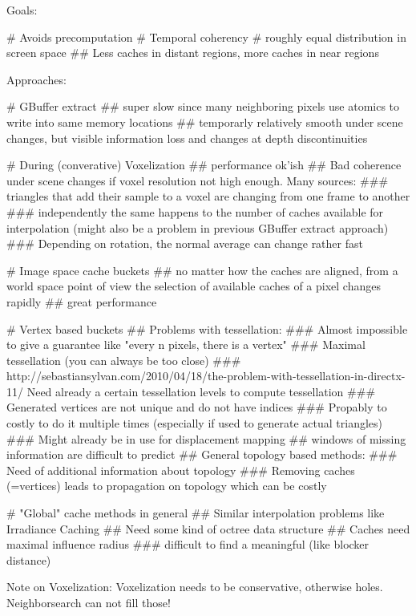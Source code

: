 \documentclass[thesis.tex]{subfiles}
\begin{document}
Goals:
\begin{easylist}[itemize]
# Avoids precomputation
# Temporal coherency
# roughly equal distribution in screen space
## Less caches in distant regions, more caches in near regions
\end{easylist}
Approaches:
\begin{easylist}[itemize]
# GBuffer extract
## super slow since many neighboring pixels use atomics to write into same memory locations
## temporarly relatively smooth under scene changes, but visible information loss and changes at depth discontinuities

# During (converative) Voxelization
## performance ok'ish
## Bad coherence under scene changes if voxel resolution not high enough. Many sources:
### triangles that add their sample to a voxel are changing from one frame to another
### independently the same happens to the number of caches available for interpolation (might also be a problem in previous GBuffer extract approach)
### Depending on rotation, the normal average can change rather fast

# Image space cache buckets
## no matter how the caches are aligned, from a world space point of view the selection of available caches of a pixel changes rapidly
## great performance

# Vertex based buckets
## Problems with tessellation:
### Almost impossible to give a guarantee like "every n pixels, there is a vertex"
### Maximal tessellation (you can always be too close)
### http://sebastiansylvan.com/2010/04/18/the-problem-with-tessellation-in-directx-11/
Need already a certain tessellation levels to compute tessellation
### Generated vertices are not unique and do not have indices
### Propably to costly to do it multiple times (especially if used to generate actual triangles)
### Might already be in use for displacement mapping
## windows of missing information are difficult to predict
## General topology based methods:
### Need of additional information about topology
### Removing caches (=vertices) leads to propagation on topology which can be costly

# "Global" cache methods in general
## Similar interpolation problems like Irradiance Caching
## Need some kind of octree data structure
## Caches need maximal influence radius
### difficult to find a meaningful (like blocker distance)
\end{easylist}

Note on Voxelization: Voxelization needs to be conservative, otherwise holes. Neighborsearch can not fill those!
\end{document}
